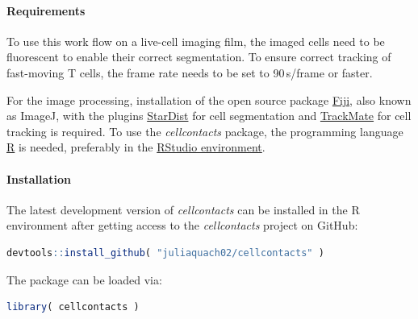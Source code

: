 \documentclass{report}
\begin{document}
\begin{figure}
\end{figure}

\paragraph{Requirements}
To use this work flow on a live-cell imaging film, the imaged cells need to be fluorescent to enable their correct segmentation. To ensure correct tracking of fast-moving T cells, the frame rate needs to be set to 90\,s/frame or faster.

For the image processing, installation of the open source package \href{https://imagej.net/software/fiji/}{Fiji}, also known as ImageJ, with the plugins \href{https://imagej.net/plugins/stardist}{StarDist} for cell segmentation and \href{https://imagej.net/plugins/trackmate/}{TrackMate} for cell tracking is required.
To use the \textit{cellcontacts} package, the programming language \href{https://cran.r-project.org/bin/windows/base/}{R} is needed, preferably in the \href{https://posit.co/download/rstudio-desktop/}{RStudio environment}.

\paragraph{Installation}
The latest development version of \textit{cellcontacts} can be installed in the R environment after getting access to the \textit{cellcontacts} project on GitHub:
\begin{lstlisting}[language=R]
	devtools::install_github( "juliaquach02/cellcontacts" ) 
\end{lstlisting}
The package can be loaded via:
\begin{lstlisting}[language=R]
	library( cellcontacts )
\end{lstlisting}
\end{document}
